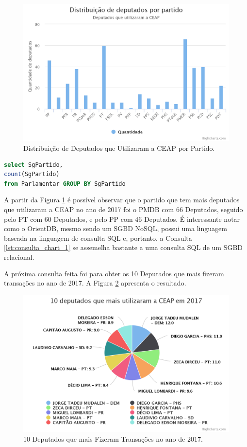 \documentclass[12pt]{article}
\begin{document}
\begin{figure}[ht]
\centering
\includegraphics[width=.6\textwidth]{chart_1.png}
\caption{Distribuição de Deputados que Utilizaram a CEAP por Partido.}
\label{fig:chart_1}
\end{figure}

\begin{lstlisting}[label={lst:consulta_chart_1}, caption={Consulta para a Figura \ref{fig:chart_1}},captionpos=b, language=sql]
select SgPartido, 
count(SgPartido) 
from Parlamentar GROUP BY SgPartido
\end{lstlisting}

A partir da Figura \ref{fig:chart_1} é possível observar que o partido que tem mais deputados que utilizaram a CEAP no ano de 2017 foi o PMDB com 66 Deputados, seguido pelo PT com 60 Deputados, e pelo PP com 46 Deputados. É interessante notar como o OrientDB, mesmo sendo um SGBD NoSQL, possui uma linguagem baseada na linguagem de consulta SQL e, portanto, a Consulta \ref{lst:consulta_chart_1} se assemelha bastante a uma consulta SQL de um SGBD relacional.

A próxima consulta feita foi para obter os 10 Deputados que mais fizeram transações no ano de 2017. A Figura \ref{fig:chart_2} apresenta o resultado.

\begin{figure}[ht]
\centering
\includegraphics[width=.6\textwidth]{chart_2.png}
\caption{10 Deputados que mais Fizeram Transações no ano de 2017.}
\label{fig:chart_2}
\end{figure}
\end{document}
